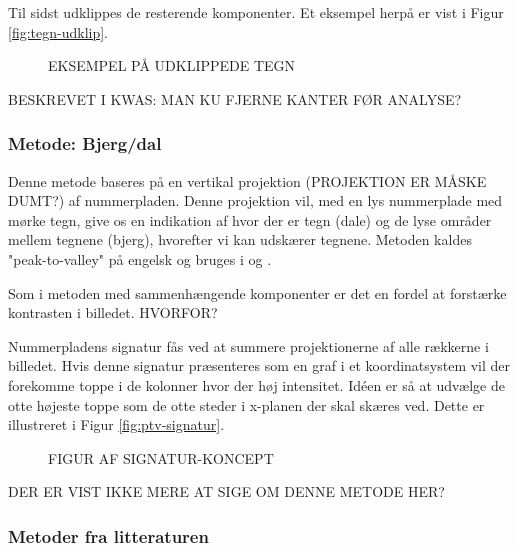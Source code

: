 Til sidst udklippes de resterende komponenter. Et eksempel herpå er vist i Figur \vref{fig:tegn-udklip}.

\begin{figure}[htp]
  \centering
  \caption{EKSEMPEL PÅ UDKLIPPEDE TEGN}
  \label{fig:tegn-udklip}
\end{figure}

BESKREVET I KWAS: MAN KU FJERNE KANTER FØR ANALYSE?

\subsubsection*{Metode: Bjerg/dal}
Denne metode baseres på en vertikal projektion (PROJEKTION ER MÅSKE DUMT?) af nummerpladen. Denne projektion vil, med en lys nummerplade med mørke tegn, give os en indikation af hvor der er tegn (dale) og de lyse områder mellem tegnene (bjerg), hvorefter vi kan udskærer tegnene. Metoden kaldes "peak-to-valley" på engelsk og bruges i \cite{ron} og \cite{kwas}.

Som i metoden med sammenhængende komponenter er det en fordel at forstærke kontrasten i billedet. HVORFOR?

Nummerpladens signatur fås ved at summere projektionerne af alle rækkerne i billedet. Hvis denne signatur præsenteres som en graf i et koordinatsystem vil der forekomme toppe i de kolonner hvor der høj intensitet. Idéen er så at udvælge de otte højeste toppe som de otte steder i x-planen der skal skæres ved. Dette er illustreret i Figur \vref{fig:ptv-signatur}.

\begin{figure}[htp]
  \centering
  \caption{FIGUR AF SIGNATUR-KONCEPT}
  \label{fig:signatur-nummerplade}
\end{figure}

DER ER VIST IKKE MERE AT SIGE OM DENNE METODE HER?

\subsubsection{Metoder fra litteraturen}

